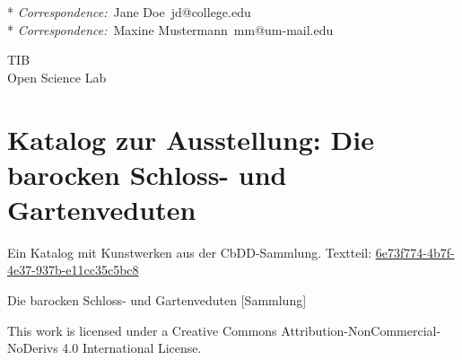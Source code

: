 \documentclass[
  11pt,
  a4paper,
  openany]{book}
\renewcommand*\contentsname{Table of contents}
\newcommand\contentsname{Table of contents}
\begin{document}
\begin{frontmatter}
\begin{titlepage}
\begin{tcolorbox}
  \vspace{1\baselineskip} 

  * \textit{Correspondence:}~Jane Doe~jd@college.edu\\
  * \textit{Correspondence:}~Maxine Mustermann~mm@um-mail.edu\\

  \end{tcolorbox}


  \vfill

  \vspace{1\baselineskip} 

  \begin{tcolorbox}
  \centering

  {
    TIB\\
    Open Science Lab
  }
  \end{tcolorbox}
  
  \end{titlepage}
  \end{frontmatter}

{\let\newpage\relax}
\renewcommand*\contentsname{Inhaltsverzeichnis}
{
\hypersetup{linkcolor=}
\setcounter{tocdepth}{2}
\tableofcontents
}
\mainmatter
{}

\chapter*{Katalog zur Ausstellung: Die barocken Schloss- und
Gartenveduten}\label{katalog-zur-ausstellung-die-barocken-schloss--und-gartenveduten}


Ein Katalog mit Kunstwerken aus der CbDD-Sammlung. Textteil:
\href{https://www.deckenmalerei.eu/42d06165-58e7-4653-bfe4-3d5f7091fc33\#6e73f774-4b7f-4e37-937b-e11cc35c5bc8}{6e73f774-4b7f-4e37-937b-e11cc35c5bc8}

Die barocken Schloss- und Gartenveduten {[}Sammlung{]}

This work is licensed under a Creative Commons
Attribution-NonCommercial-NoDerivs 4.0 International License.
\end{document}

